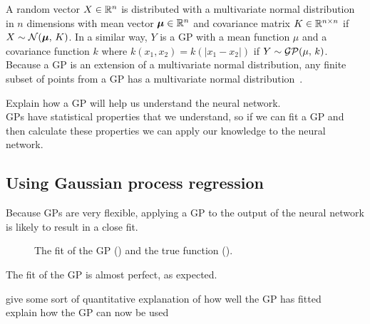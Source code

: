 A random vector \(X \in \mathbb{R}{}^n\) is distributed with a multivariate normal distribution in \(n\) dimensions with mean vector \(\bm{\mu} \in \mathbb{R}{}^n\) and covariance matrix \(K \in \mathbb{R}^{n \times n}\) if \(X \sim \mathcal{N}(\bm{\mu},\, K)\).
In a similar way, \(Y\) is a \ac{GP} with a mean function \(\mu\) and a covariance function \(k\) where \(k(x_1, x_2) = k(\left|x_1 - x_2\right|)\) if \(Y \sim \mathcal{GP}(\mu,\, k)\).
Because a \ac{GP} is an extension of a multivariate normal distribution, any finite subset of points from a \ac{GP} has a multivariate normal distribution~\autocite[515]{williams1996}.

\begin{todo}
	Explain how a GP will help us understand the neural network. \\
	GPs have statistical properties that we understand, so if we can fit a GP and then calculate these properties we can apply our knowledge to the neural network.
\end{todo}

\subsection{Using Gaussian process regression}

Because \acp{GP} are very flexible, applying a \ac{GP} to the output of the neural network is likely to result in a close fit.

\begin{figure}[htbp]
	\centering
	
	\caption{The fit of the \ac{GP} (\gpcolour) and the true function (\truthcolour).}
	\label{fig:gp-fit}
\end{figure}

The fit of the \ac{GP} is almost perfect, as expected.

\begin{todo}
	give some sort of quantitative explanation of how well the GP has fitted \\
	explain how the GP can now be used
\end{todo}

